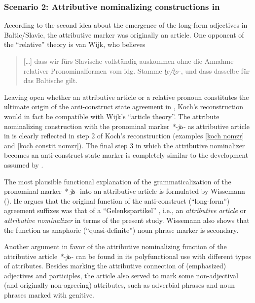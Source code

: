 \subsubsection{Scenario 2: Attributive nominalizing constructions in } 
According to the second idea about the emergence of the long-form adjectives in Baltic\slash{}Slavic, the attributive marker was originally an article. One opponent of the “relative” theory is van Wijk, who believes 
\begin{quote}
[\dots] dass wir fürs Slavische vollständig auskommen ohne die Annahme relativer Pronominalformen vom idg. Stamme \textit{i̭e/i̭o-}, und dass dasselbe für das Baltische gilt. \citep[28]{wijk1935}%
\end{quote}
Leaving open whether an attributive article or a relative pronoun constitutes the ultimate origin of the anti\hyp{}construct state agreement in , Koch's reconstruction would in fact be compatible with Wijk's “article theory”. The attribute nominalizing construction with the pronominal marker \textit{*-jь-} as attributive article in  is clearly reflected in step 2 of Koch's reconstruction (examples \ref{koch nomzr} and \ref{koch constit nomzr}). The final step 3 in which the attributive nominalizer becomes an anti\hyp{}construct state marker is completely similar to the development assumed by \cite{wijk1935}.

The most plausible functional explanation of the grammaticalization of the pronominal marker \textit{*-jь-} into an attributive article is formulated by Wissemann (\citeyear{wissemann1958}). He argues that the original function of the anti\hyp{}construct (“long-form”) agreement suffixes was that of a “Gelenkspartikel” \citep[76]{wissemann1958}, i.e., an \textit{attributive article} or \textit{attributive nominalizer} in terms of the present study. Wissemann also shows that the function as anaphoric (“quasi-definite”) noun phrase marker is secondary.

Another argument in favor of the attributive nominalizing function of the  attributive article \textit{*-jь-} can be found in its polyfunctional use with different types of attributes. Besides marking the attributive connection of (emphasized) adjectives and participles, the article also served to mark some non-adjectival (and originally non-agreeing) attributes, such as adverbial phrases and noun phrases marked with genitive.

